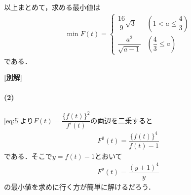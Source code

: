 \documentclass[../../main.tex]{subfiles}
\begin{document}
以上まとめて，求める最小値は
\begin{align}
  \min F(t)=
  \begin{cases}\displaystyle
    \dfrac{16}{9}\sqrt{3} & \left(1<a\le\dfrac{4}{3}\right) \\
    \dfrac{a^2}{\sqrt{a-1}} & \left(\dfrac{4}{3}\le a\right)
  \end{cases}
\end{align}
である．

{\bf [別解]}

\paragraph{(2)}
\cref{eq:5}より$F(t)=\dfrac{\{f(t)\}^2}{f'(t)}$の両辺を二乗すると
\begin{align}
  F^2(t) = \dfrac{\{f(t)\}^4}{f(t)-1}
\end{align}
である．そこで$y=f(t)-1$とおいて
\begin{align}
  F^2(t) = \dfrac{(y+1)^4}{y}
\end{align}
の最小値を求めに行く方が簡単に解けるだろう．
\end{document}
